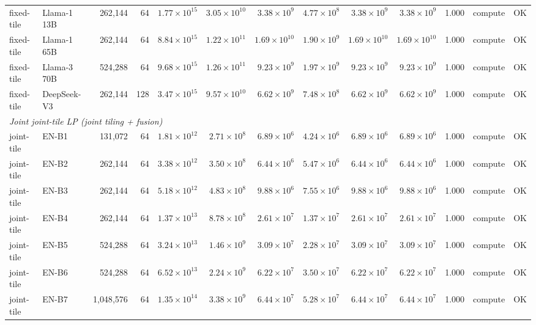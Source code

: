\begin{table}[ht!]
{\begin{tabular}{llrrrrrrrrrll}
fixed-tile & Llama-1 13B & 262{,}144 &  64 & $1.77\times10^{15}$ & $3.05\times10^{10}$ & $3.38\times10^{9}$ & $4.77\times10^{8}$ & $3.38\times10^{9}$ & $3.38\times10^{9}$ & 1.000 & compute & OK \\
fixed-tile & Llama-1 65B & 262{,}144 &  64 & $8.84\times10^{15}$ & $1.22\times10^{11}$ & $1.69\times10^{10}$& $1.90\times10^{9}$ & $1.69\times10^{10}$& $1.69\times10^{10}$& 1.000 & compute & OK \\
fixed-tile & Llama-3 70B & 524{,}288 &  64 & $9.68\times10^{15}$ & $1.26\times10^{11}$ & $9.23\times10^{9}$ & $1.97\times10^{9}$ & $9.23\times10^{9}$ & $9.23\times10^{9}$ & 1.000 & compute & OK \\
fixed-tile & DeepSeek-V3 & 262{,}144 & 128 & $3.47\times10^{15}$ & $9.57\times10^{10}$ & $6.62\times10^{9}$ & $7.48\times10^{8}$ & $6.62\times10^{9}$ & $6.62\times10^{9}$ & 1.000 & compute & OK \\
\midrule
\multicolumn{13}{l}{\textit{Joint joint-tile LP (joint tiling + fusion)}} \\
\midrule
joint-tile & EN-B1       &    131{,}072 &  64 & $1.81\times10^{12}$ & $2.71\times10^{8}$  & $6.89\times10^{6}$ & $4.24\times10^{6}$ & $6.89\times10^{6}$ & $6.89\times10^{6}$ & 1.000 & compute & OK \\
joint-tile & EN-B2       &    262{,}144 &  64 & $3.38\times10^{12}$ & $3.50\times10^{8}$  & $6.44\times10^{6}$ & $5.47\times10^{6}$ & $6.44\times10^{6}$ & $6.44\times10^{6}$ & 1.000 & compute & OK \\
joint-tile & EN-B3       &    262{,}144 &  64 & $5.18\times10^{12}$ & $4.83\times10^{8}$  & $9.88\times10^{6}$ & $7.55\times10^{6}$ & $9.88\times10^{6}$ & $9.88\times10^{6}$ & 1.000 & compute & OK \\
joint-tile & EN-B4       &    262{,}144 &  64 & $1.37\times10^{13}$ & $8.78\times10^{8}$  & $2.61\times10^{7}$ & $1.37\times10^{7}$ & $2.61\times10^{7}$ & $2.61\times10^{7}$ & 1.000 & compute & OK \\
joint-tile & EN-B5       &    524{,}288 &  64 & $3.24\times10^{13}$ & $1.46\times10^{9}$  & $3.09\times10^{7}$ & $2.28\times10^{7}$ & $3.09\times10^{7}$ & $3.09\times10^{7}$ & 1.000 & compute & OK \\
joint-tile & EN-B6       &    524{,}288 &  64 & $6.52\times10^{13}$ & $2.24\times10^{9}$  & $6.22\times10^{7}$ & $3.50\times10^{7}$ & $6.22\times10^{7}$ & $6.22\times10^{7}$ & 1.000 & compute & OK \\
joint-tile & EN-B7       & 1{,}048{,}576 &  64 & $1.35\times10^{14}$ & $3.38\times10^{9}$  & $6.44\times10^{7}$ & $5.28\times10^{7}$ & $6.44\times10^{7}$ & $6.44\times10^{7}$ & 1.000 & compute & OK \\

\end{tabular}}
\end{table}
